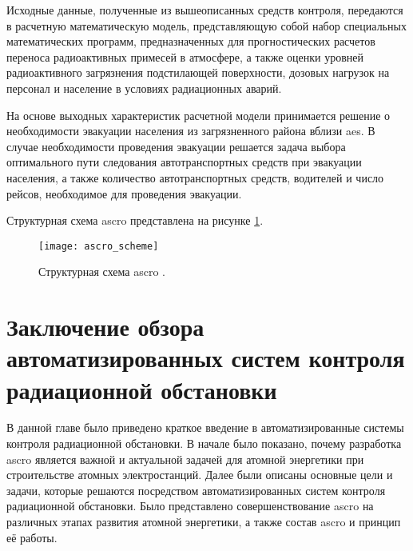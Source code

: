 Исходные данные, полученные из вышеописанных средств контроля, передаются в расчетную математическую модель, 
представляющую собой набор специальных математических программ, предназначенных для прогностических расчетов переноса 
радиоактивных примесей в атмосфере, а также оценки уровней радиоактивного загрязнения подстилающей поверхности, дозовых 
нагрузок на персонал и население в условиях радиационных аварий.

На основе выходных характеристик расчетной модели принимается решение о необходимости эвакуации населения из 
загрязненного района вблизи \ac{aes}. В случае необходимости проведения эвакуации решается задача выбора оптимального 
пути следования автотранспортных средств при эвакуации населения, а также количество автотранспортных средств, водителей 
и число рейсов, необходимое для проведения эвакуации.

Структурная схема \ac{ascro} представлена на рисунке \ref{fig_ascro_scheme}.

\begin{figure}[ht!]
	\centering
	\texttt{[image: ascro\_scheme]}
	\captionsetup{justification=centering}
    \caption{Структурная схема \ac{ascro} \cite{elokhin}.}
    \label{fig_ascro_scheme}
\end{figure}

\section{Заключение обзора автоматизированных систем контроля радиационной обстановки}

В данной главе было приведено краткое введение в автоматизированные системы контроля радиационной обстановки. В начале 
было показано, почему разработка \ac{ascro} является важной и актуальной задачей для атомной энергетики при 
строительстве атомных электростанций. Далее были описаны основные цели и задачи, которые решаются посредством 
автоматизированных систем контроля радиационной обстановки. Было представлено совершенствование \ac{ascro} на различных 
этапах развития атомной энергетики, а также состав \ac{ascro} и принцип её работы.